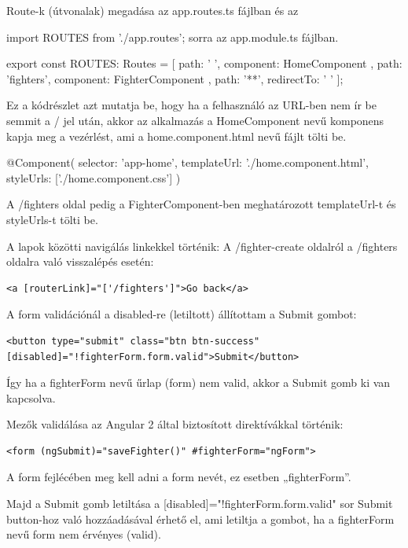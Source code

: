 Route-k (útvonalak) megadása az app.routes.ts fájlban és az 

import { ROUTES } from './app.routes'; sorra az app.module.ts fájlban.

\begin{cpp}
export const ROUTES: Routes = [
  { path: ' ', component: HomeComponent },
  { path: 'fighters', component: FighterComponent },
  { path: '**', redirectTo: ' ' }
];
\end{cpp}

Ez a kódrészlet azt mutatja be, hogy ha a felhasználó az URL-ben nem ír be semmit a / jel után, akkor az alkalmazás a HomeComponent nevű komponens kapja meg a vezérlést, ami a home.component.html nevű fájlt tölti be.

\begin{cpp}
@Component({
  selector: 'app-home',
  templateUrl: './home.component.html',
  styleUrls: ['./home.component.css']
})
\end{cpp}

A /fighters oldal pedig a FighterComponent-ben meghatározott templateUrl-t és styleUrls-t tölti be.

A lapok közötti navigálás linkekkel történik: 
A /fighter-create oldalról a /fighters oldalra való visszalépés esetén:

\begin{verbatim}
<a [routerLink]="['/fighters']">Go back</a>
\end{verbatim}


A form validációnál a disabled-re (letiltott) állítottam a Submit gombot:

\begin{verbatim}
<button type="submit" class="btn btn-success" [disabled]="!fighterForm.form.valid">Submit</button>
\end{verbatim}

Így ha a fighterForm nevű űrlap (form) nem valid, akkor a Submit gomb ki van kapcsolva.

Mezők validálása az Angular 2 által biztosított direktívákkal történik:

\begin{verbatim}
<form (ngSubmit)="saveFighter()" #fighterForm="ngForm">
\end{verbatim}

A form fejlécében meg kell adni a form nevét, ez esetben „fighterForm”.

Majd a Submit gomb letiltása a [disabled]="!fighterForm.form.valid" sor Submit button-hoz való hozzáadásával érhető el, ami letiltja a gombot, ha a fighterForm nevű form nem érvényes (valid).

